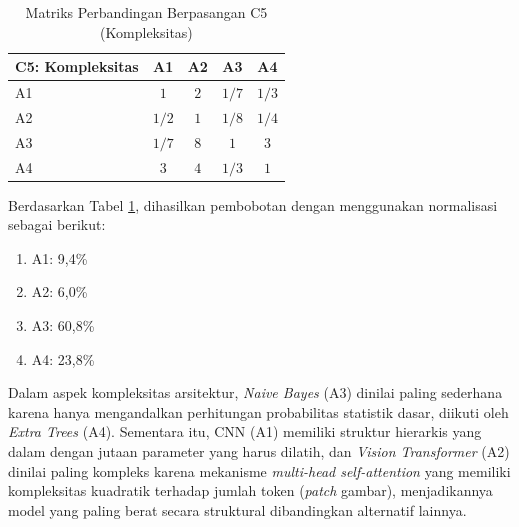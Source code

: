 \begin{enumerate}
	\begin{table}[H]
		\centering
		\caption{Matriks Perbandingan Berpasangan C5 (Kompleksitas)}
		\label{tab:perbandingan_c5}
		\begin{tabular}{|l|c|c|c|c|}
			\hline
			C5: Kompleksitas & A1 & A2 & A3 & A4 \\ \hline
			A1 & $1$ & $2$ & $1/7$ & $1/3$ \\ \hline
			A2 & $1/2$ & $1$ & $1/8$ & $1/4$ \\ \hline
			A3 & $1/7$ & $8$ & $1$ & $3$ \\ \hline
			A4 & $3$ & $4$ & $1/3$ & $1$ \\ \hline
		\end{tabular}
	\end{table}
	
	Berdasarkan Tabel \ref{tab:perbandingan_c5}, dihasilkan pembobotan dengan menggunakan normalisasi sebagai berikut:
	\begin{enumerate}
		\item A1: 9,4\%
		\item A2: 6,0\%
		\item A3: 60,8\%
		\item A4: 23,8\%\\	
	\end{enumerate}
	
	Dalam aspek kompleksitas arsitektur, \textit{Naive Bayes} (A3) dinilai paling sederhana karena hanya mengandalkan perhitungan probabilitas statistik dasar, diikuti oleh \textit{Extra Trees} (A4). Sementara itu, CNN (A1) memiliki struktur hierarkis yang dalam dengan jutaan parameter yang harus dilatih, dan \textit{Vision Transformer} (A2) dinilai paling kompleks karena mekanisme \textit{multi-head self-attention} yang memiliki kompleksitas kuadratik terhadap jumlah token (\textit{patch} gambar), menjadikannya model yang paling berat secara struktural dibandingkan alternatif lainnya.
	

\end{enumerate}
